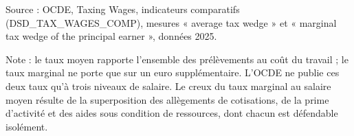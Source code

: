 Source : OCDE, Taxing Wages, indicateurs comparatifs (DSD\_TAX\_WAGES\_COMP), mesures « average tax wedge » et « marginal tax wedge of the principal earner », données 2025.\par Note : le taux moyen rapporte l'ensemble des prélèvements au coût du travail ; le taux marginal ne porte que sur un euro supplémentaire. L'OCDE ne publie ces deux taux qu'à trois niveaux de salaire. Le creux du taux marginal au salaire moyen résulte de la superposition des allègements de cotisations, de la prime d'activité et des aides sous condition de ressources, dont chacun est défendable isolément.
